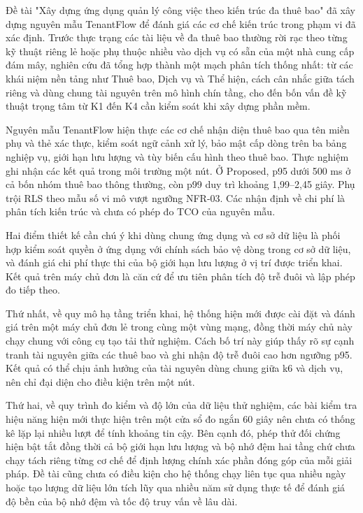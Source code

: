 \label{chap:v4-conclusion}
\label{v4-conclusion-kết-luận}

Đề tài "Xây dựng ứng dụng quản lý công việc theo kiến trúc đa thuê bao" đã xây dựng nguyên mẫu TenantFlow để đánh giá các cơ chế kiến trúc trong phạm vi đã xác định. Trước thực trạng các tài liệu về đa thuê bao thường rời rạc theo từng kỹ thuật riêng lẻ hoặc phụ thuộc nhiều vào dịch vụ có sẵn của một nhà cung cấp đám mây, nghiên cứu đã tổng hợp thành một mạch phân tích thống nhất: từ các khái niệm nền tảng như Thuê bao, Dịch vụ và Thể hiện, cách cân nhắc giữa tách riêng và dùng chung tài nguyên trên mô hình chín tầng, cho đến bốn vấn đề kỹ thuật trọng tâm từ K1 đến K4 cần kiểm soát khi xây dựng phần mềm.

Nguyên mẫu TenantFlow hiện thực các cơ chế nhận diện thuê bao qua tên miền phụ và thẻ xác thực, kiểm soát ngữ cảnh xử lý, bảo mật cấp dòng trên ba bảng nghiệp vụ, giới hạn lưu lượng và tùy biến cấu hình theo thuê bao. Thực nghiệm ghi nhận các kết quả trong môi trường một nút. Ở Proposed, p95 dưới 500 ms ở cả bốn nhóm thuê bao thông thường, còn p99 duy trì khoảng 1,99--2,45 giây. Phụ trội RLS theo mẫu số vi mô vượt ngưỡng NFR-03. Các nhận định về chi phí là phân tích kiến trúc và chưa có phép đo TCO của nguyên mẫu.

Hai điểm thiết kế cần chú ý khi dùng chung ứng dụng và cơ sở dữ liệu là phối hợp kiểm soát quyền ở ứng dụng với chính sách bảo vệ dòng trong cơ sở dữ liệu, và đánh giá chi phí thực thi của bộ giới hạn lưu lượng ở vị trí được triển khai. Kết quả trên máy chủ đơn là căn cứ để ưu tiên phân tích độ trễ đuôi và lập phép đo tiếp theo.

\label{v4-conclusion-hạn-chế-của-đề-tài}

Thứ nhất, về quy mô hạ tầng triển khai, hệ thống hiện mới được cài đặt và đánh giá trên một máy chủ đơn lẻ trong cùng một vùng mạng, đồng thời máy chủ này chạy chung với công cụ tạo tải thử nghiệm. Cách bố trí này giúp thấy rõ sự cạnh tranh tài nguyên giữa các thuê bao và ghi nhận độ trễ đuôi cao hơn ngưỡng p95. Kết quả có thể chịu ảnh hưởng của tài nguyên dùng chung giữa k6 và dịch vụ, nên chỉ đại diện cho điều kiện trên một nút.

Thứ hai, về quy trình đo kiểm và độ lớn của dữ liệu thử nghiệm, các bài kiểm tra hiệu năng hiện mới thực hiện trên một cửa sổ đo ngắn 60 giây nên chưa có thống kê lặp lại nhiều lượt để tính khoảng tin cậy. Bên cạnh đó, phép thử đối chứng hiện bật tắt đồng thời cả bộ giới hạn lưu lượng và bộ nhớ đệm hai tầng chứ chưa chạy tách riêng từng cơ chế để định lượng chính xác phần đóng góp của mỗi giải pháp. Đề tài cũng chưa có điều kiện cho hệ thống chạy liên tục qua nhiều ngày hoặc tạo lượng dữ liệu lớn tích lũy qua nhiều năm sử dụng thực tế để đánh giá độ bền của bộ nhớ đệm và tốc độ truy vấn về lâu dài.

